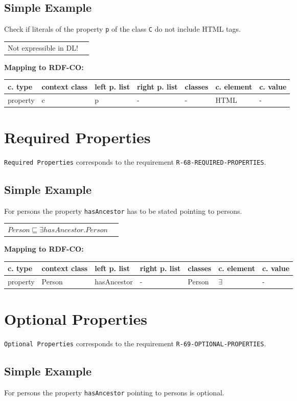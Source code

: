\documentclass{llncs}
\newcommand{\ms}[1]{\texttt{#1}}
\newenvironment{gcotable}{
  \scriptsize
  \sffamily
  \vspace{0cm}
	\begin{center}
	\textbf{\vspace{0.4cm}Mapping to RDF-CO:} \\
  \begin{tabular}{l|l|l|l|l|l|l}
	\hline
  \textbf{c. type} & \textbf{context class} & \textbf{left p. list} & \textbf{right p. list} & \textbf{classes} & \textbf{c. element} & \textbf{c. value} \\
  \hline

}{
  \hline
  \end{tabular}
	\end{center}
}
\newenvironment{DL}{
  \vspace{0cm}
	\begin{center}
  \begin{tabular}{r l}

}{
  \end{tabular}
	\end{center}
}
\begin{document}
\subsection{Simple Example}

Check if literals of the property \ms{p} of the class \ms{C} do not include HTML tags.

\begin{DL}
Not expressible in DL!
\end{DL}

\begin{gcotable}
property & c & p & - & - & HTML & - \\
\end{gcotable}

\section{Required Properties}

\ms{Required Properties} corresponds to the requirement \ms{R-68-REQUIRED-PROPERTIES}.

\subsection{Simple Example}

For persons the property \ms{hasAncestor} has to be stated pointing to persons.

\begin{DL}
$Person \sqsubseteq \exists hasAncestor.Person$
\end{DL}

\begin{gcotable}
property & Person & hasAncestor & - & Person & $\exists$ & - \\
\end{gcotable}

\section{Optional Properties}

\ms{Optional Properties} corresponds to the requirement \ms{R-69-OPTIONAL-PROPERTIES}.

\subsection{Simple Example}

For persons the property \ms{hasAncestor} pointing to persons is optional.
\end{document}
